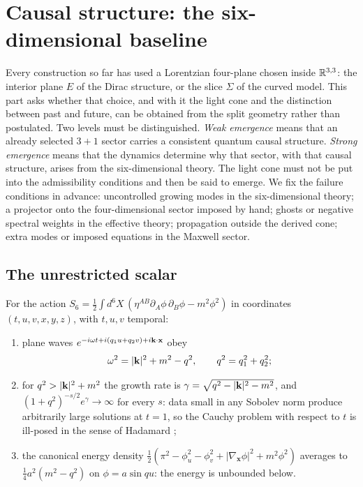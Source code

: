 \section{Causal structure: the six-dimensional baseline}
\label{sec:baseline}

Every construction so far has used a Lorentzian four-plane chosen inside $\mathbb{R}^{3,3}$: the interior plane $E$ of the Dirac structure, or the slice $\Sigma$
of the curved model. This part asks whether that choice, and with it the light cone and the distinction between past and future, can be obtained from the
split geometry rather than postulated. Two levels must be distinguished. \emph{Weak emergence} means that an already selected $3{+}1$ sector carries a
consistent quantum causal structure. \emph{Strong emergence} means that the dynamics determine why that sector, with that causal structure, arises from the
six-dimensional theory. The light cone must not be put into the admissibility conditions and then be said to emerge. We fix the failure conditions in advance:
uncontrolled growing modes in the six-dimensional theory; a projector onto the four-dimensional sector imposed by hand; ghosts or negative spectral weights in
the effective theory; propagation outside the derived cone; extra modes or imposed equations in the Maxwell sector.

\subsection{The unrestricted scalar}

\begin{proposition}
\label{prop:toy}
For the action $S_6=\tfrac12\int d^6X\,(\eta^{AB}\partial_A\phi\,\partial_B\phi-m^2\phi^2)$ in coordinates $(t,u,v,x,y,z)$, with $t,u,v$ temporal:
\begin{enumerate}[label=(\roman*),leftmargin=2.2em]
\item plane waves $e^{-i\omega t+i(q_1u+q_2v)+i\mathbf k\cdot\mathbf x}$ obey
\begin{equation}
\label{eq:toydisp}
\omega^2=|\mathbf k|^2+m^2-q^2,\qquad q^2=q_1^2+q_2^2 ;
\end{equation}
\item for $q^2>|\mathbf k|^2+m^2$ the growth rate is $\gamma=\sqrt{q^2-|\mathbf k|^2-m^2}$, and $(1+q^2)^{-s/2}e^\gamma\to\infty$ for every $s$: data small in any Sobolev norm
produce arbitrarily large solutions at $t=1$, so the Cauchy problem with respect to $t$ is ill-posed in the sense of Hadamard \cite{Hadamard23};
\item the canonical energy density $\tfrac12(\pi^2-\phi_u^2-\phi_v^2+|\nabla_{\mathbf x}\phi|^2+m^2\phi^2)$ averages to $\tfrac14a^2(m^2-q^2)$ on $\phi=a\sin qu$: the
energy is unbounded below.
\end{enumerate}
\end{proposition}

